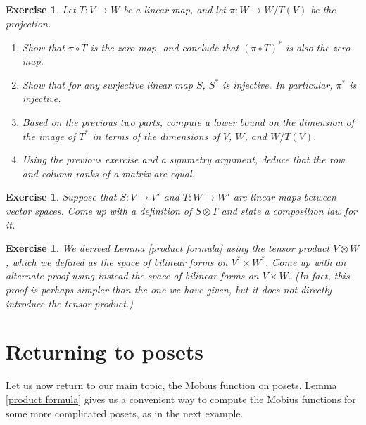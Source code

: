 \documentclass[11pt]{article}
\newtheorem{exercise}[theorem]{Exercise}
\begin{document}
\begin{exercise}
Let $T : V \to W$ be a linear map, and let $\pi : W \to W/T(V)$ be the
projection.
\begin{enumerate}
\item Show that $\pi \circ T$ is the zero map, and conclude that $(\pi
  \circ T)^*$ is also the zero map.
\item Show that for any surjective linear map $S$, $S^*$ is
  injective. In particular, $\pi^*$ is injective.
\item Based on the previous two parts, compute a lower bound on the
  dimension of the image of $T^*$ in terms of the dimensions of $V$,
  $W$, and $W/T(V)$.
\item Using the previous exercise and a symmetry argument, deduce that
  the row and column ranks of a matrix are equal.
\end{enumerate}
\end{exercise}

\begin{exercise}
Suppose that $S : V \to V'$ and $T : W \to W'$ are linear maps between
vector spaces. Come up with a definition of $S \otimes T$ and state a
composition law for it.
\end{exercise}

\begin{exercise}
We derived Lemma \ref{product formula} using the tensor product $V
\otimes W$, which we defined as the space of bilinear forms on $V^*
\times W^*$. Come up with an alternate proof using instead the space
of bilinear forms on $V \times W$. (In fact, this proof is perhaps
simpler than the one we have given, but it does not directly introduce
the tensor product.)
\end{exercise}

\section{Returning to posets}

Let us now return to our main topic, the Mobius function on
posets. Lemma \ref{product formula} gives us a convenient way to
compute the Mobius functions for some more complicated posets, as in
the next example.
\end{document}
